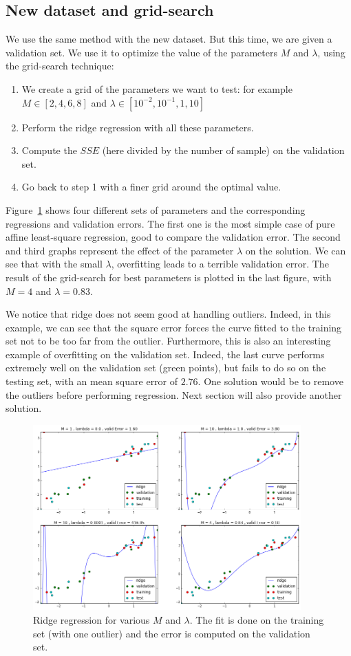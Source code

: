 \subsection{New dataset and grid-search}
We use the same method with the new dataset. But this time, we are given a validation set. We use it to optimize the value of the parameters $M$ and $\lambda$, using the grid-search technique:
\begin{enumerate}
    \item We create a grid of the parameters we want to test: for example $M \in [2,4,6,8]$ and $\lambda \in [10^{-2},10^{-1},1,10]$
    \item Perform the ridge regression with all these parameters.
    \item Compute the $SSE$ (here divided by the number of sample) on the validation set.
    \item Go back to step 1 with a finer grid around the optimal value.
\end{enumerate}
Figure~\ref{fig:ridge2} shows four different sets of parameters and the corresponding regressions and validation errors. The first one is the most simple case of pure affine least-square regression, good to compare the validation error.  The second and third graphs represent the effect of the parameter $\lambda$ on the solution. We can see that with the small $\lambda$, overfitting leads to a terrible validation error. The result of the grid-search for best parameters is plotted in the last figure, with $M=4$ and $\lambda = 0.83$.

We notice that ridge does not seem good at handling outliers. Indeed, in this example, we can see that the square error forces the curve fitted to the training set not to be too far from the outlier. Furthermore, this is also an interesting example of overfitting on the validation set. Indeed, the last curve performs extremely well on the validation set (green points), but fails to do so on the testing set, with an mean square error of $2.76$. One solution would be to remove the outliers before performing regression. Next section will also provide another solution.

\begin{figure}[h]
  \centering
 \includegraphics[width=10.3cm]{../Figures/Q3/ridge2.png}
\caption{Ridge regression for various $M$ and $\lambda$. The fit is done on the training set (with one outlier) and the error is computed on the validation set.}
\label{fig:ridge2}
\end{figure}

